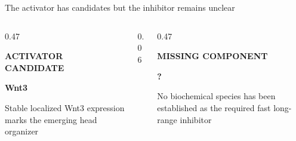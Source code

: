 





\begin{frame}{The activator has candidates but the inhibitor remains unclear}

  \vspace{-0.12cm}

  \begin{columns}[c,onlytextwidth]
    \begin{column}{0.47\textwidth}
      \centering
      {\color{HydraGold}\bfseries\fontsize{8}{9.5}\selectfont
        ACTIVATOR CANDIDATE\par}
      \vspace{0.22cm}
      {\color{HydraWhite}\bfseries\fontsize{21}{24}\selectfont Wnt3\par}
      \vspace{0.22cm}
      {\color{HydraMuted}\fontsize{7.5}{9.2}\selectfont
        Stable localized Wnt3 expression marks the emerging head organizer
      \par}
    \end{column}

    \begin{column}{0.06\textwidth}
      \centering{\color{HydraLine}\fontsize{28}{28}\selectfont $\vert$}
    \end{column}

    \begin{column}{0.47\textwidth}
      \centering
      {\color{HydraCyan}\bfseries\fontsize{8}{9.5}\selectfont
        MISSING COMPONENT\par}
      \vspace{0.22cm}
      {\color{HydraWhite}\bfseries\fontsize{18}{22}\selectfont ?\par}
      \vspace{0.22cm}
      {\color{HydraMuted}\fontsize{7.5}{9.2}\selectfont
        No biochemical species has been established as the required fast long-range inhibitor
      \par}
    \end{column}
  \end{columns}


\end{frame}


